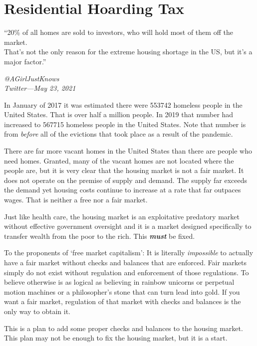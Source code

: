 \section{Residential Hoarding Tax}

\epigraph{``20\% of all homes are sold to investors, who will hold most of them off the market.\\[1\baselineskip] That's not the only reason for the extreme housing shortage in the US, but it's a major factor.''}{\textit{@AGirlJustKnows \\ Twitter---May 23, 2021}}

\noindent In January of 2017 it was estimated there were \num[group-separator={,}]{553742} homeless people in the United States. That is over half a million people. In 2019 that number had increased to \num[group-separator={,}]{567715} homeless people in the United States. Note that number is from \emph{before} all of the evictions that took place as a result of the \sars[2]{} pandemic.

There are far more vacant homes in the United States than there are people who need homes. Granted, many of the vacant homes are not located where the people are, but it is very clear that the housing market is not a fair market. It does not operate on the premise of supply and demand. The supply far exceeds the demand yet housing costs continue to increase at a rate that far outpaces wages. That is neither a free nor a fair market.

Just like health care, the housing market is an exploitative predatory market without effective government oversight and it is a market designed specifically to transfer wealth from the poor to the rich. This \textbf{\emph{must}} be fixed.

To the proponents of `free market capitalism': It is literally \emph{impossible} to actually have a fair market without checks and balances that are enforced. Fair markets simply do not exist without regulation and enforcement of those regulations. To believe otherwise is as logical as believing in rainbow unicorns or perpetual motion machines or a philosopher's stone that can turn lead into gold. If you want a fair market, regulation of that market with checks and balances is the only way to obtain it.

This is a plan to add some proper checks and balances to the housing market. This plan may not be enough to fix the housing market, but it is a start.

